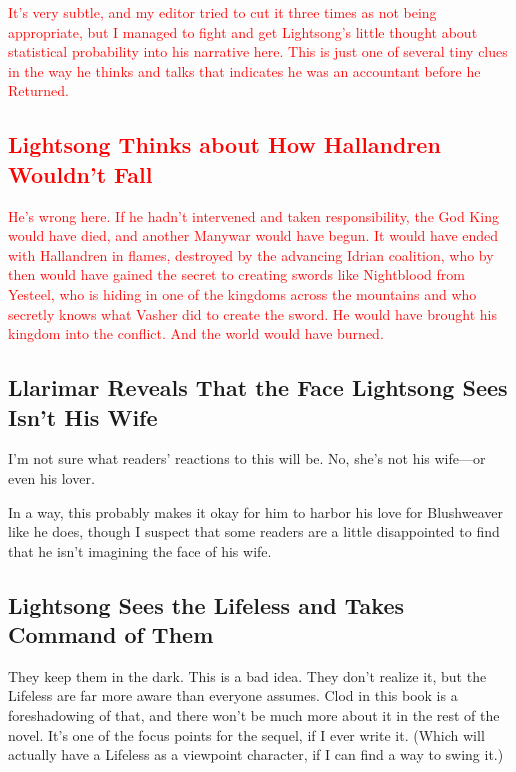 \textcolor{red}{
It’s very subtle, and my editor tried to cut it three times as not being appropriate, but I managed to fight and get Lightsong’s little thought about statistical probability into his narrative here. This is just one of several tiny clues in the way he thinks and talks that indicates he was an accountant before he Returned.
}
\textcolor{red}{
\subsection*{Lightsong Thinks about How Hallandren Wouldn’t Fall}
}
\textcolor{red}{
He’s wrong here. If he hadn’t intervened and taken responsibility, the God King would have died, and another Manywar would have begun. It would have ended with Hallandren in flames, destroyed by the advancing Idrian coalition, who by then would have gained the secret to creating swords like Nightblood from Yesteel, who is hiding in one of the kingdoms across the mountains and who secretly knows what Vasher did to create the sword. He would have brought his kingdom into the conflict. And the world would have burned.
}

\subsection*{Llarimar Reveals That the Face Lightsong Sees Isn’t His Wife}

I’m not sure what readers’ reactions to this will be. No, she’s not his wife—or even his lover.

In a way, this probably makes it okay for him to harbor his love for Blushweaver like he does, though I suspect that some readers are a little disappointed to find that he isn’t imagining the face of his wife.

\subsection*{Lightsong Sees the Lifeless and Takes Command of Them}

They keep them in the dark. This is a bad idea. They don’t realize it, but the Lifeless are far more aware than everyone assumes. Clod in this book is a foreshadowing of that, and there won’t be much more about it in the rest of the novel. It’s one of the focus points for the sequel, if I ever write it. (Which will actually have a Lifeless as a viewpoint character, if I can find a way to swing it.)



